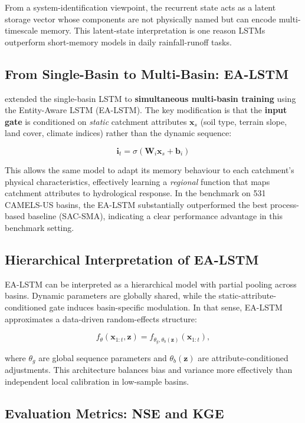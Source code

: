 \documentclass[
]{krantz}
\begin{document}
From a system-identification viewpoint, the recurrent state acts as a latent storage
vector whose components are not physically named but can encode multi-timescale memory.
This latent-state interpretation is one reason LSTMs outperform short-memory models in
daily rainfall-runoff tasks.

\subsection{From Single-Basin to Multi-Basin: EA-LSTM}\label{nh-ea-lstm}

\citet{kratzert2019} extended the single-basin LSTM to \textbf{simultaneous multi-basin training}
using the Entity-Aware LSTM (EA-LSTM). The key modification is that the \textbf{input gate}
is conditioned on \emph{static} catchment attributes \(\mathbf{x}_s\) (soil type, terrain
slope, land cover, climate indices) rather than the dynamic sequence:

\[\mathbf{i}_t = \sigma(\mathbf{W}_i \mathbf{x}_s + \mathbf{b}_i)\]

This allows the same model to adapt its memory behaviour to each catchment's physical
characteristics, effectively learning a \emph{regional} function that maps catchment
attributes to hydrological response. In the benchmark on 531 CAMELS-US basins, the
EA-LSTM substantially outperformed the best process-based baseline
(SAC-SMA), indicating a clear performance advantage in this benchmark setting.

\subsection{Hierarchical Interpretation of EA-LSTM}\label{hierarchical-interpretation-of-ea-lstm}

EA-LSTM can be interpreted as a hierarchical model with partial pooling across basins.
Dynamic parameters are globally shared, while the static-attribute-conditioned gate
induces basin-specific modulation. In that sense, EA-LSTM approximates a data-driven
random-effects structure:

\[
f_{\theta}(\mathbf{x}_{1:t}, \mathbf{z}) = f_{\theta_g,\theta_b(\mathbf{z})}(\mathbf{x}_{1:t}),
\]

where \(\theta_g\) are global sequence parameters and \(\theta_b(\mathbf{z})\) are
attribute-conditioned adjustments. This architecture balances bias and variance more
effectively than independent local calibration in low-sample basins.

\subsection{Evaluation Metrics: NSE and KGE}\label{evaluation-metrics-nse-and-kge}
\end{document}
